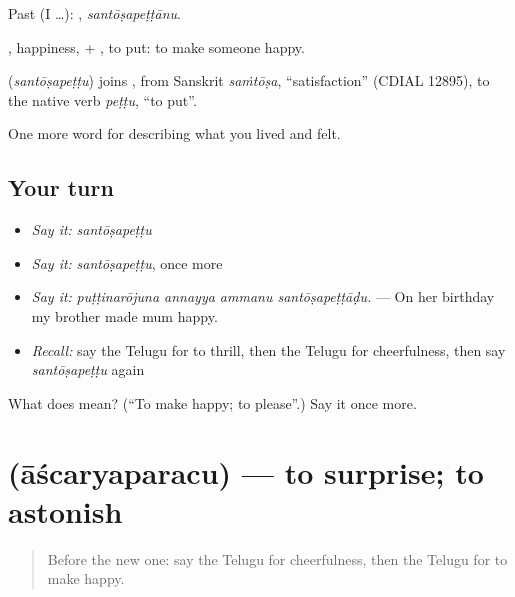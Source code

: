 Past (I …): , \emph{santōṣapeṭṭānu}.

, happiness, + , to put: to make someone happy.

\begin{cousinweb}
\textbf{} (\emph{santōṣapeṭṭu}) joins , from Sanskrit \emph{saṁtōṣa}, \textquotedblleft{}satisfaction\textquotedblright{} (CDIAL 12895), to the native verb \emph{peṭṭu}, \textquotedblleft{}to put\textquotedblright{}.
\end{cousinweb}

\begin{grammarlens}[title={What you've built}]
One more word for describing what you lived and felt.
\end{grammarlens}

\subsection*{Your turn}
\begin{itemize}
\raggedright
  \item \emph{Say it:} \emph{santōṣapeṭṭu}
  \item \emph{Say it:} \emph{santōṣapeṭṭu}, once more
  \item \emph{Say it:} \emph{puṭṭinarōjuna annayya ammanu santōṣapeṭṭāḍu.} — On her birthday my brother made mum happy.
  \item \emph{Recall:} say the Telugu for to thrill, then the Telugu for cheerfulness, then say \emph{santōṣapeṭṭu} again
\end{itemize}

\begin{tcolorbox}[breakable,colback=teal!4,colframe=teal!35!black,title={Before you move on}]
What does  mean? (\textquotedblleft{}To make happy; to please\textquotedblright{}.) Say it once more.
\end{tcolorbox}
\section[\texorpdfstring{\te{ఆశ్చర్యపరచు} (āścaryaparacu)}{ఆశ్చర్యపరచు (āścaryaparacu)}]{ (āścaryaparacu) — to surprise; to astonish}

\label{lesson:TE-C501-ascaryaparacu}



\begin{quote}
Before the new one: say the Telugu for cheerfulness, then the Telugu for to make happy.
\end{quote}

